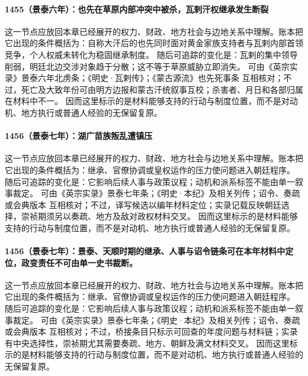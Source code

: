 \paragraph{1455（景泰六年）：也先在草原内部冲突中被杀，瓦剌汗权继承发生断裂} 这一节点应放回本章已经展开的权力、财政、地方社会与边地关系中理解。账本把它出现的条件概括为：自称大汗后的也先同时面对黄金家族支持者与瓦剌内部首领竞争，个人权威未转化为稳固继承制度。 随后可追踪的变化是：瓦剌的集中领导削弱，明廷北边交涉对象趋于分散；这不等于草原威胁立即消失。 可由《英宗实录》景泰六年北虏条；《明史·瓦剌传》；《蒙古源流》也先死事条 互相核对；不过，死亡及大致年份可由明方边报和蒙古汗统叙事互校；杀害者、月日和各部归属在材料中不一。 因而这里标示的是材料能够支持的行动与制度位置，而不是对动机、地方执行或普通人经验的无保留复原。

\paragraph{1456（景泰七年）：湖广苗族叛乱遭镇压} 这一节点应放回本章已经展开的权力、财政、地方社会与边地关系中理解。账本把它出现的条件概括为：继承、官僚协调或皇权运作的压力使问题进入朝廷程序。 随后可追踪的变化是：它影响后续人事与政策议程；动机和派系标签不能由单一叙事裁定。 可由《英宗实录》景泰七年条；《明史·本纪》及相关列传；诏令、奏疏或会典版本 互相核对；不过，译写候选以编年材料定位；实录记载反映朝廷选择，崇祯期须另以奏疏、地方及敌对政权材料交叉。 因而这里标示的是材料能够支持的行动与制度位置，而不是对动机、地方执行或普通人经验的无保留复原。

\paragraph{1456（景泰七年）：景泰、天顺时期的继承、人事与诏令链条可在本年材料中定位，政变责任不可由单一史书裁断。} 这一节点应放回本章已经展开的权力、财政、地方社会与边地关系中理解。账本把它出现的条件概括为：继承、官僚协调或皇权运作的压力使问题进入朝廷程序。 随后可追踪的变化是：它影响后续人事与政策议程；动机和派系标签不能由单一叙事裁定。 可由《英宗实录》景泰七年条；《明史·本纪》及相关列传；诏令、奏疏或会典版本 互相核对；不过，桥接条目只标示可回查的年度问题与材料链；实录有中央选择性，崇祯期尤其需要奏疏、地方、朝鲜及满文材料交叉。 因而这里标示的是材料能够支持的行动与制度位置，而不是对动机、地方执行或普通人经验的无保留复原。

